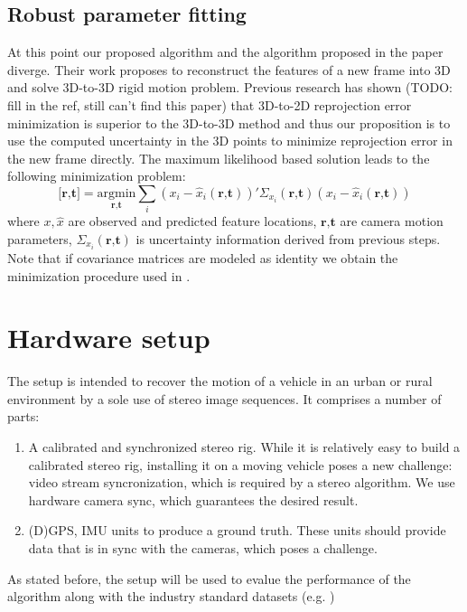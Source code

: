 \documentclass[10pt]{article}         %
\begin{document}
\subsection{Robust parameter fitting}\label{subsect:param_fit}
At this point our proposed algorithm and the algorithm proposed in the paper diverge.  Their work proposes to reconstruct the features of a new frame into 3D and solve 3D-to-3D rigid motion problem.  Previous research has shown (TODO: fill in the ref, still can't find this paper) that 3D-to-2D reprojection error minimization is superior to the 3D-to-3D method and thus our proposition is to use the computed uncertainty in the 3D points to minimize reprojection error in the new frame directly. The maximum likelihood based solution leads to the following minimization problem:
\[
\textbf{[r,t]} = \underset{\textbf{r,t}}{\text{argmin}} \sum_i (x_i-\hat{x}_i(\textbf{r,t}))'\Sigma_{x_i}(\textbf{r,t})(x_i-\hat{x}_i(\textbf{r,t}))
\]
where $x,\hat{x}$ are observed and predicted feature locations, $\textbf{r,t}$ are camera motion parameters, $\Sigma_{x_i}(\textbf{r,t})$ is uncertainty information derived from previous steps.  Note that if covariance matrices are modeled as identity we obtain the minimization procedure used in \cite{Geiger2011IV}.
\section{Hardware setup}\label{sect:setup}

The setup is intended to recover the motion of a vehicle in an urban or rural environment by a sole use of stereo image sequences.  It comprises a number of parts:
\begin{enumerate}
\item A calibrated and synchronized stereo rig. While it is relatively easy to build a calibrated stereo rig, installing it on a moving vehicle poses a new challenge: video stream syncronization, which is required by a stereo algorithm.  We use hardware camera sync, which guarantees the desired result.
\item (D)GPS, IMU units to produce a ground truth.  These units should provide data that is in sync with the cameras, which poses a challenge.
\end{enumerate}
As stated before, the setup will be used to evalue the performance of the algorithm along with the industry standard datasets (e.g. \cite{Geiger2012CVPR})



\end{document}
